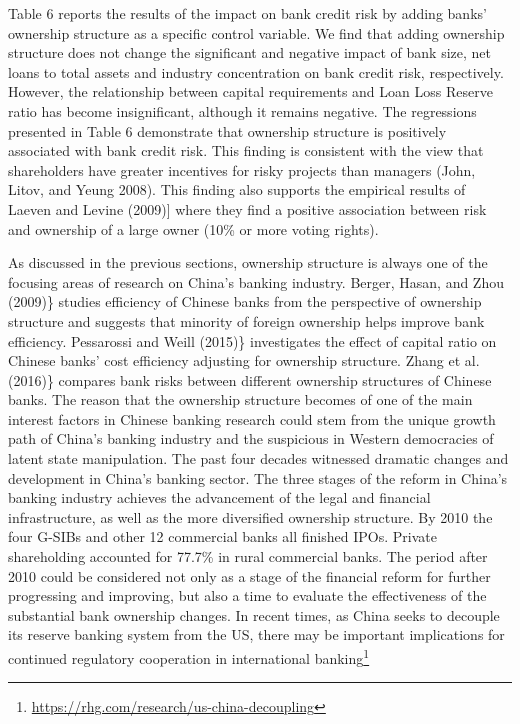 \documentclass{article}
\begin{document}
Table 6 reports the results of the impact on bank credit risk by adding
banks' ownership structure as a specific control variable. We find that
adding ownership structure does not change the significant and negative
impact of bank size, net loans to total assets and industry
concentration on bank credit risk, respectively. However, the
relationship between capital requirements and Loan Loss Reserve ratio
has become insignificant, although it remains negative. The regressions
presented in Table 6 demonstrate that ownership structure is positively
associated with bank credit risk. This finding is consistent with the
view that shareholders have greater incentives for risky projects than
managers (John, Litov, and Yeung 2008). This finding also supports the
empirical results of Laeven and Levine (2009){]} where they find a
positive association between risk and ownership of a large owner (10\%
or more voting rights).

As discussed in the previous sections, ownership structure is always one
of the focusing areas of research on China's banking industry. Berger,
Hasan, and Zhou (2009)\} studies efficiency of Chinese banks from the
perspective of ownership structure and suggests that minority of foreign
ownership helps improve bank efficiency. Pessarossi and Weill (2015)\}
investigates the effect of capital ratio on Chinese banks' cost
efficiency adjusting for ownership structure. Zhang et al. (2016)\}
compares bank risks between different ownership structures of Chinese
banks. The reason that the ownership structure becomes of one of the
main interest factors in Chinese banking research could stem from the
unique growth path of China's banking industry and the suspicious in
Western democracies of latent state manipulation. The past four decades
witnessed dramatic changes and development in China's banking sector.
The three stages of the reform in China's banking industry achieves the
advancement of the legal and financial infrastructure, as well as the
more diversified ownership structure. By 2010 the four G-SIBs and other
12 commercial banks all finished IPOs. Private shareholding accounted
for 77.7\% in rural commercial banks. The period after 2010 could be
considered not only as a stage of the financial reform for further
progressing and improving, but also a time to evaluate the effectiveness
of the substantial bank ownership changes. In recent times, as China
seeks to decouple its reserve banking system from the US, there may be
important implications for continued regulatory cooperation in
international banking\footnote{\url{https://rhg.com/research/us-china-decoupling}}
\end{document}
